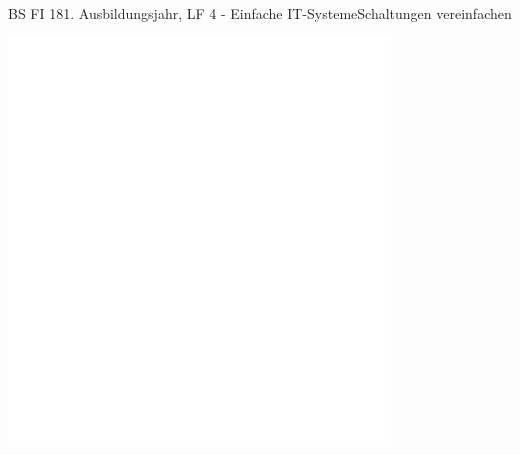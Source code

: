 \documentclass[oneside,openany,headings=optiontotoc,11pt,numbers=noenddot]{scrreprt}
\begin{document}
\begin{worksheet}{BS FI 18}{1. Ausbildungsjahr, LF 4 - Einfache IT-Systeme}{Schaltungen vereinfachen}
\begin{framed}
			\includegraphics[width=0.76\textwidth]{../../empty.jpg}
		\end{framed}
	\end{worksheet}
\end{document}
